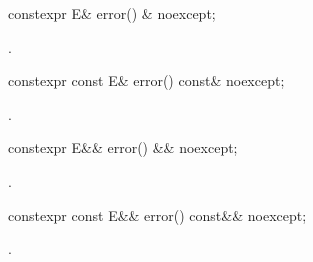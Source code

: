 %
\begin{itemdecl}
constexpr E& error() & noexcept;
\end{itemdecl}

\begin{itemdescr}
\pnum
\returns
{}.
\end{itemdescr}

%
\begin{itemdecl}
constexpr const E& error() const& noexcept;
\end{itemdecl}

\begin{itemdescr}
\pnum
\returns
{}.
\end{itemdescr}

%
\begin{itemdecl}
constexpr E&& error() && noexcept;
\end{itemdecl}

\begin{itemdescr}
\pnum
\returns
{}.
\end{itemdescr}

%
\begin{itemdecl}
constexpr const E&& error() const&& noexcept;
\end{itemdecl}

\begin{itemdescr}
\pnum
\returns
{}.
\end{itemdescr}
